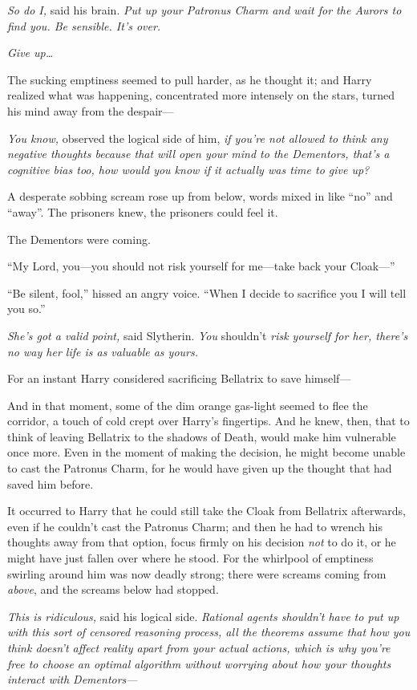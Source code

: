\emph{So do I,} said his brain. \emph{Put up your Patronus Charm and wait for the Aurors to find you. Be sensible. It’s over.}

\emph{Give up…}

The sucking emptiness seemed to pull harder, as he thought it; and Harry realized what was happening, concentrated more intensely on the stars, turned his mind away from the despair—

\emph{You know,} observed the logical side of him, \emph{if you’re not allowed to think  \emph{any} negative thoughts because that will open your mind to the Dementors, \emph{that’s} a cognitive bias too, how would you know if it actually \emph{was} time to give up?}

A desperate sobbing scream rose up from below, words mixed in like “no” and “away”. The prisoners knew, the prisoners could feel it.

The Dementors were coming.

“My Lord, you—you should not risk yourself for me—take back your Cloak—”

“Be silent, fool,” hissed an angry voice. “When I decide to sacrifice you I will tell you so.”

\emph{She’s got a valid point,} said Slytherin. \emph{You} shouldn’t \emph{risk yourself for her, there’s no way her life is as valuable as yours.}

For an instant Harry considered sacrificing Bellatrix to save himself—

And in that moment, some of the dim orange gas-light seemed to flee the corridor, a touch of cold crept over Harry’s fingertips. And he knew, then, that to think of leaving Bellatrix to the shadows of Death, would make him vulnerable once more. Even in the moment of making the decision, he might become unable to cast the Patronus Charm, for he would have given up the thought that had saved him before.

It occurred to Harry that he could still take the Cloak from Bellatrix afterwards, even if he couldn’t cast the Patronus Charm; and then he had to wrench his thoughts away from that option, focus firmly on his decision \emph{not} to do it, or he might have just fallen over where he stood. For the whirlpool of emptiness swirling around him was now deadly strong; there were screams coming from \emph{above}, and the screams below had stopped.

\emph{This is ridiculous,} said his logical side. \emph{Rational agents shouldn’t have to put up with this sort of censored reasoning process, all the theorems assume that how you think doesn’t affect reality apart from your actual actions, which is why you’re free to choose an optimal algorithm without worrying about how your thoughts interact with Dementors—}

